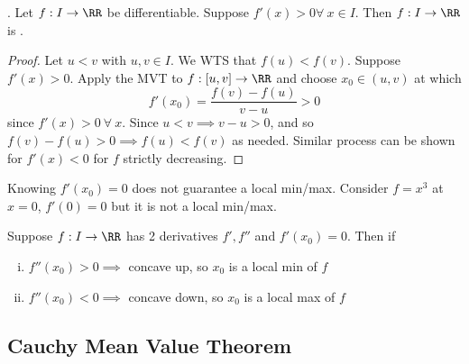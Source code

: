 \documentclass[12pt]{scrartcl}
\begin{document}
\begin{definition}
  . Let $f: I \to \RR$ 
  be differentiable. Suppose $f'(x) > 0 \forall \ x \in I$. Then $f: I \to \RR$ 
  is .
  
  \begin{proof}
    Let $u < v$ with $u, v \in I$. We WTS that $f(u) < f(v)$.
    Suppose $f'(x) > 0$. Apply the MVT to $f: [u, v] \to \RR$ and choose 
    $x_0 \in (u, v)$ at which 
    \[f'(x_0) = \frac{f(v) - f(u)}{v - u} > 0 \]
    since $f'(x) > 0 \ \forall \ x$. Since $u < v \implies v-u > 0$, and 
    so $f(v) - f(u) > 0 \implies f(u) < f(v)$ as needed. Similar process 
    can be shown for $f'(x) < 0$ for $f$ strictly decreasing.
  \end{proof}
\end{definition}

\begin{remark}
  Knowing $f'(x_0) = 0$ does not guarantee a local min/max. Consider 
  $f = x^3$ at $x=0$, $f'(0) = 0$ but it is not a local min/max.
\end{remark}

\begin{theorem}
  Suppose $f: I \to \RR$ has 2 derivatives $f', f''$ and $f'(x_0) = 0$. Then if 
  \begin{enumerate}[i.]
    \item $f''(x_0) > 0 \implies$ concave up, so $x_0$ is a local min of $f$
    \item $f''(x_0) < 0 \implies$ concave down, so $x_0$ is a local max of $f$
  \end{enumerate}
\end{theorem}

\subsection{Cauchy Mean Value Theorem}
\end{document}

